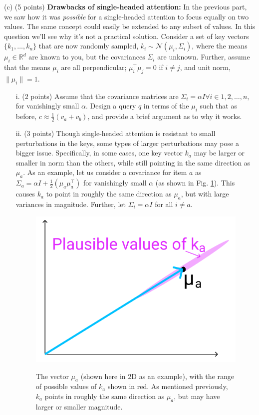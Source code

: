 \documentclass[letterpaper,12pt]{article}
\begin{document}
	\noindent(c) (5 points) \textbf{Drawbacks of single-headed attention:} In the previous part, we saw how it was \textit{possible} for a single-headed attention to focus equally on two values. The same concept could easily be extended to any subset of values. In this question we'll see why it's not a practical solution. Consider a set of key vectors $\{k_1, \ldots , k_n\}$ that are now randomly sampled, $k_i \sim \mathcal{N}(μ_i,\Sigma_i)$, where the means $μ_i \in \mathbb{R}^d$ are known to you, but the covariances $\Sigma_i$ are unknown. Further, assume that the means $μ_i$ are all perpendicular; $\mu^\top_i \mu_j = 0$ if $i \neq j$, and unit norm, $\|\mu_i\| = 1$.
	
	\begin{itemize}
	\item[i.]
	(2 points) Assume that the covariance matrices are $\Sigma_i = \alpha I \forall i \in {1, 2, \ldots , n}$, for vanishingly small $\alpha$. Design a query $q$ in terms of the $\mu_i$ such that as before, $c \approx \frac{1}{2}(v_a +v_b)$, and provide a brief argument as to why it works.
		
	\item[ii.]
	(3 points) Though single-headed attention is resistant to small perturbations in the keys, some types of larger perturbations may pose a bigger issue. Specifically, in some cases, one key vector $k_a$ may be larger or smaller in norm than the others, while still pointing in the same direction as $\mu_a$. As an example, let us consider a covariance for item $a$ as $\Sigma_a = \alpha I+ \frac{1}{2}(\mu_a\mu^\top_a )$ for vanishingly small $\alpha$ (as shown in Fig. \ref{fig: vector}). This causes $k_a$ to point in roughly the same direction as $\mu_a$, but with large variances in magnitude. Further, let $\Sigma_i = \alpha I$ for all $i \neq a$.
		
	\begin{figure}[htbp] 
		\centering 
		\includegraphics[width=0.5\linewidth]{ka_plausible}
		\captionsetup{font=small}
		\label{vector}
		\caption{
			\label{fig: vector} %
			The vector $\mu_a$ (shown here in 2D as an example), with the range of possible values of $k_a$ shown in red. As mentioned previously, $k_a$ points in roughly the same direction as $\mu_a$, but may have larger or smaller magnitude.
		}
	\end{figure}
		

\end{itemize}
\end{document}
